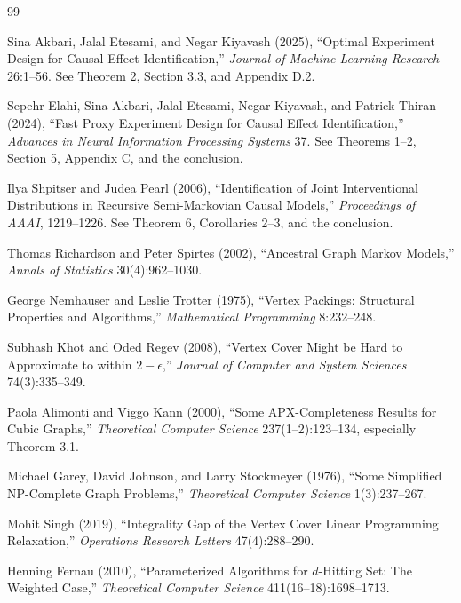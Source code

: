 \documentclass{article}
\begin{document}
\begin{thebibliography}{99}

   Sina Akbari, Jalal Etesami, and Negar Kiyavash (2025), ``Optimal Experiment Design for Causal Effect Identification,'' \emph{Journal of Machine Learning Research} 26:1--56. See Theorem 2, Section 3.3, and Appendix D.2.

   Sepehr Elahi, Sina Akbari, Jalal Etesami, Negar Kiyavash, and Patrick Thiran (2024), ``Fast Proxy Experiment Design for Causal Effect Identification,'' \emph{Advances in Neural Information Processing Systems} 37. See Theorems 1--2, Section 5, Appendix C, and the conclusion.

   Ilya Shpitser and Judea Pearl (2006), ``Identification of Joint Interventional Distributions in Recursive Semi-Markovian Causal Models,'' \emph{Proceedings of AAAI}, 1219--1226. See Theorem 6, Corollaries 2--3, and the conclusion.

   Thomas Richardson and Peter Spirtes (2002), ``Ancestral Graph Markov Models,'' \emph{Annals of Statistics} 30(4):962--1030.

   George Nemhauser and Leslie Trotter (1975), ``Vertex Packings: Structural Properties and Algorithms,'' \emph{Mathematical Programming} 8:232--248.

   Subhash Khot and Oded Regev (2008), ``Vertex Cover Might be Hard to Approximate to within \(2-\epsilon\),'' \emph{Journal of Computer and System Sciences} 74(3):335--349.

   Paola Alimonti and Viggo Kann (2000), ``Some APX-Completeness Results for Cubic Graphs,'' \emph{Theoretical Computer Science} 237(1--2):123--134, especially Theorem 3.1.

   Michael Garey, David Johnson, and Larry Stockmeyer (1976), ``Some Simplified NP-Complete Graph Problems,'' \emph{Theoretical Computer Science} 1(3):237--267.

   Mohit Singh (2019), ``Integrality Gap of the Vertex Cover Linear Programming Relaxation,'' \emph{Operations Research Letters} 47(4):288--290.

   Henning Fernau (2010), ``Parameterized Algorithms for \(d\)-Hitting Set: The Weighted Case,'' \emph{Theoretical Computer Science} 411(16--18):1698--1713.


\end{thebibliography}
\end{document}
